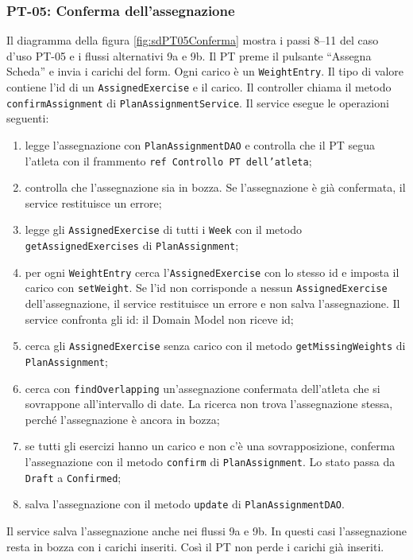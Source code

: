 \subsubsection{PT-05: Conferma dell'assegnazione}
Il diagramma della figura \ref{fig:sdPT05Conferma} mostra i passi
8--11 del caso d'uso PT-05 e i flussi alternativi 9a e 9b. Il PT
preme il pulsante \enquote{Assegna Scheda} e invia i carichi del form.
Ogni carico è un \texttt{WeightEntry}. Il tipo di valore contiene
l'id di un \texttt{AssignedExercise} e il carico. Il controller chiama
il metodo \texttt{confirmAssignment} di
\texttt{PlanAssignmentService}. Il service esegue le operazioni
seguenti:
\begin{enumerate}
  \item legge l'assegnazione con \texttt{PlanAssignmentDAO} e
    controlla che il PT segua l'atleta con il frammento
    \texttt{ref Controllo PT dell'atleta};
  \item controlla che l'assegnazione sia in bozza. Se l'assegnazione
    è già confermata, il service restituisce un errore;
  \item legge gli \texttt{AssignedExercise} di tutti i \texttt{Week}
    con il metodo \texttt{getAssignedExercises} di
    \texttt{PlanAssignment};
  \item per ogni \texttt{WeightEntry} cerca l'\texttt{AssignedExercise}
    con lo stesso id e imposta il carico con \texttt{setWeight}. Se
    l'id non corrisponde a nessun \texttt{AssignedExercise}
    dell'assegnazione, il service restituisce un errore e non salva
    l'assegnazione. Il service confronta gli id: il Domain Model non
    riceve id;
  \item cerca gli \texttt{AssignedExercise} senza carico con il
    metodo \texttt{getMissingWeights} di \texttt{PlanAssignment};
  \item cerca con \texttt{findOverlapping} un'assegnazione confermata
    dell'atleta che si sovrappone all'intervallo di date. La ricerca
    non trova l'assegnazione stessa, perché l'assegnazione è ancora in
    bozza;
  \item se tutti gli esercizi hanno un carico e non c'è una
    sovrapposizione, conferma l'assegnazione con il metodo
    \texttt{confirm} di \texttt{PlanAssignment}. Lo stato passa da
    \texttt{Draft} a \texttt{Confirmed};
  \item salva l'assegnazione con il metodo \texttt{update} di
    \texttt{PlanAssignmentDAO}.
\end{enumerate}
Il service salva l'assegnazione anche nei flussi 9a e 9b. In questi
casi l'assegnazione resta in bozza con i carichi inseriti. Così il PT
non perde i carichi già inseriti.

